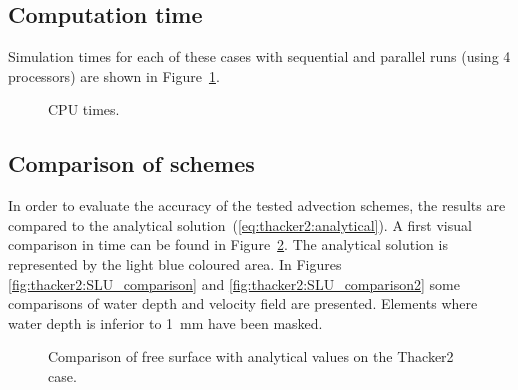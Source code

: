 \subsection{Computation time}

Simulation times for each of these cases with sequential and parallel runs
(using 4 processors) are shown in Figure~\ref{fig:thacker2:cputime}.

\begin{figure}[h!]
  \centering
  \caption{CPU times.}
  \label{fig:thacker2:cputime}
\end{figure}

\subsection{Comparison of schemes}

In order to evaluate the accuracy of the tested advection schemes, the results
are compared to the analytical solution~(\ref{eq:thacker2:analytical}).
A first visual comparison in time can be found in Figure~\ref{fig:thacker2:SLTime}.
The analytical solution is represented by the light blue coloured area.
In Figures \ref{fig:thacker2:SLU_comparison} and \ref{fig:thacker2:SLU_comparison2}
some comparisons of water depth and velocity field are presented.
Elements where water depth is inferior to 1~mm have been masked.

\begin{figure}[H]
\begin{minipage}[t]{0.5\textwidth}
 \centering
\end{minipage}
\begin{minipage}[t]{0.5\textwidth}
 \centering
\end{minipage}
\begin{minipage}[t]{0.5\textwidth}
 \centering
\end{minipage}
\begin{minipage}[t]{0.5\textwidth}
 \centering
\end{minipage}
  \caption{Comparison of free surface with analytical values on the Thacker2 case.}
  \label{fig:thacker2:SLTime}
\end{figure}

